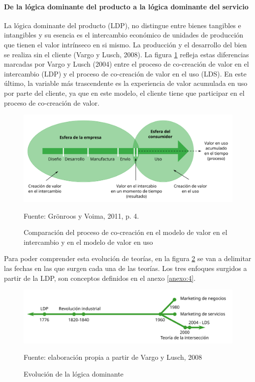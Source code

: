 \paragraph{De la lógica dominante del producto a la lógica dominante del servicio}
\label{section:logicasDominantes}

La lógica dominante del producto (LDP), no distingue entre bienes tangibles e intangibles y su esencia es el intercambio económico de unidades de producción que tienen el valor intrínseco en si mismo. La producción y el desarrollo del bien se realiza sin el cliente (Vargo y Lusch, 2008). La figura \ref{fig:valorUso} refleja estas diferencias marcadas por Vargo y Lusch (2004) entre el proceso de co-creación de valor en el intercambio (LDP) y el proceso de co-creación de valor en el uso (LDS). En este último, la variable más trascendente es la experiencia de valor acumulada en uso por parte del cliente, ya que en este modelo, el cliente tiene que participar en el proceso de co-creación de valor. 

\begin{figure}[!h]
	\caption{Comparación del proceso de co-creación en el modelo de valor en el intercambio y en el modelo de valor en uso}
	\centering \includegraphics[width=150mm]{capitulos/graficos/valorUso} 
	\label{fig:valorUso} 
	
		\footnotesize
		Fuente: Grönroos y Voima, 2011, p. 4.
\end{figure}

Para poder comprender esta evolución de teorías, en la figura \ref{fig:evolucion} se van a delimitar las fechas en las que surgen cada una de las teorías. Los tres enfoques surgidos a partir de la LDP, son conceptos definidos en el anexo \ref{anexo:4}.

\begin{figure}[!h]
	\caption{Evolución de la lógica dominante}
	\centering \includegraphics[width=150mm]{capitulos/graficos/evolucion} 
	\label{fig:evolucion} 
	
		\footnotesize
		Fuente: elaboración propia a partir de Vargo y Lusch, 2008
\end{figure}

